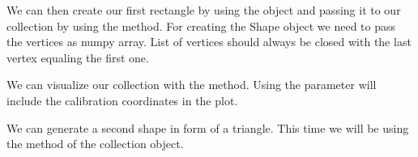 \documentclass[letterpaper,10pt,english,openany,oneside]{sphinxmanual}
\begin{document}
\sphinxAtStartPar
We can then create our first rectangle by using the {\hyperref[\detokenize{pages/modules:lmd.lib.Shape}]{}} object and passing it to our collection by using the {\hyperref[\detokenize{pages/modules:lmd.lib.Collection.add_shape}]{}} method. For creating the Shape object we need to pass the vertices as numpy array. List of vertices should always be closed with the last vertex equaling the first one.

\begin{sphinxVerbatim}[commandchars=\\\{\}]
  \PYG{p}{[}\PYG{p}{[}\PYG{p}{]}
                                  \PYG{p}{[}\PYG{p}{]}
                                  \PYG{p}{[}\PYG{p}{]}
                                  \PYG{p}{[}\PYG{p}{]}
                                  \PYG{p}{[}\PYG{p}{]}\PYG{p}{]}
  
\end{sphinxVerbatim}

\sphinxAtStartPar
We can visualize our collection with the {\hyperref[\detokenize{pages/modules:lmd.lib.Collection.plot}]{}} method. Using the  parameter will include the calibration coordinates in the plot.

\begin{sphinxVerbatim}[commandchars=\\\{\}]
  
\end{sphinxVerbatim}

\noindent{}

\sphinxAtStartPar
We can generate a second shape in form of a triangle. This time we will be using the {\hyperref[\detokenize{pages/modules:lmd.lib.Collection.new_shape}]{}} method of the collection object.
\end{document}

